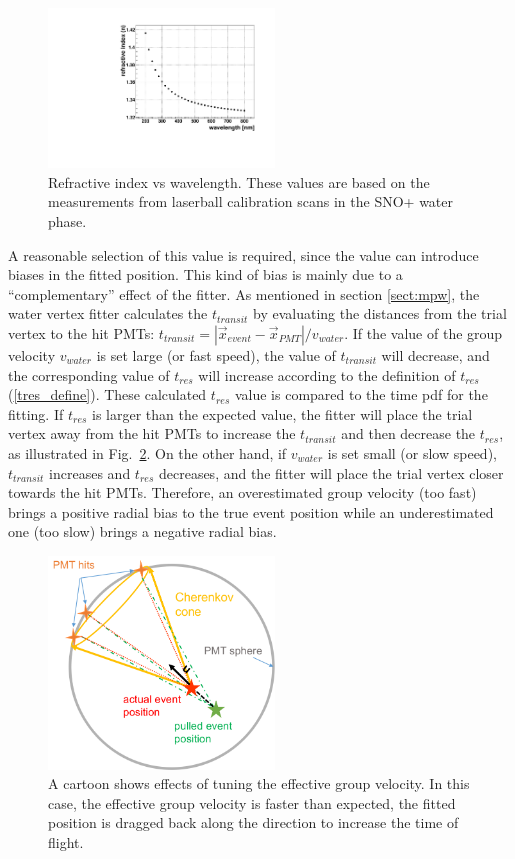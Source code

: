 \begin{figure}[!htb]
	\centering
	\includegraphics[width=6cm]{refractiveIndexVsWavelength.pdf}
	\caption{Refractive index vs wavelength. These values are based on the measurements from laserball calibration scans in the SNO+ water phase\cite{laserball_groupVelocity}.}
	\label{nVsWavelength}
\end{figure}

A reasonable selection of this value is required, since the value can introduce biases in the fitted position. This kind of bias is mainly due to a ``complementary'' effect of the fitter. As mentioned in section \ref{sect:mpw}, the water vertex fitter calculates the $t_{transit}$ by evaluating the distances from the trial vertex to the hit PMTs: $t_{transit}=|\vec{x}_{event}-\vec{x}_{PMT}|/v_{water}$. If the value of the group velocity $v_{water}$ is set large (or fast speed), the value of $t_{transit}$ will decrease, and the corresponding value of $t_{res}$ will increase according to the definition of $t_{res}$(\ref{tres_define}). These calculated $t_{res}$ value is compared to the time pdf for the fitting. If $t_{res}$ is larger than the expected value, the fitter will place the trial vertex away from the 
hit PMTs to increase the $t_{transit}$ and then decrease the $t_{res}$, as illustrated in Fig.~\ref{effectiveVg}. On the other hand, if $v_{water}$ is set small (or slow speed), $t_{transit}$ increases and $t_{res}$ decreases, and the fitter will place the trial vertex closer towards the hit PMTs.
Therefore, an overestimated group velocity (too fast) brings a positive radial bias to the true event position while an underestimated one (too slow) brings a negative radial bias.
\begin{figure}[!htb]
	\centering
	\includegraphics[width=6cm]{effectOfGroupVelocity.png}
	\caption{A cartoon shows effects of tuning the effective group velocity. In this case, the effective group velocity is faster than expected, the fitted position is dragged back along the direction to increase the time of flight.}
	\label{effectiveVg}
\end{figure}

